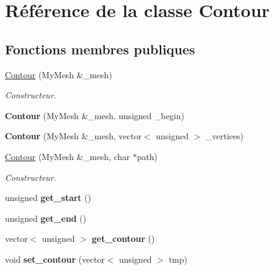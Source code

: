 \hypertarget{classContour}{}\section{Référence de la classe Contour}
\label{classContour}
\subsection*{Fonctions membres publiques}
\begin{DoxyCompactItemize}
\item 
\hyperlink{classContour_a7522d78ab496badf3b1727202ed15492}{Contour} (My\+Mesh \&\+\_\+mesh)
\begin{DoxyCompactList}\small\item\em Constructeur. \end{DoxyCompactList}\item 
\mbox{\label{classContour_a45bf85c9d66109bbdda7d3b688665e2a}} 
{\bfseries Contour} (My\+Mesh \&\+\_\+mesh, unsigned \+\_\+begin)
\item 
\mbox{\label{classContour_a944fb89ff1f9f6dc6850bab1d14479d8}} 
{\bfseries Contour} (My\+Mesh \&\+\_\+mesh, vector$<$ unsigned $>$ \+\_\+vertices)
\item 
\hyperlink{classContour_af584aa2a5e9de4660cb2bc0e187868c6}{Contour} (My\+Mesh \&\+\_\+mesh, char $\ast$path)
\begin{DoxyCompactList}\small\item\em Constructeur. \end{DoxyCompactList}\item 
\mbox{\label{classContour_ac10722aa3766b0c03bfe602209b36a9a}} 
unsigned {\bfseries get\+\_\+start} ()
\item 
\mbox{\label{classContour_abccf731418475131b8d5f4ee08905b99}} 
unsigned {\bfseries get\+\_\+end} ()
\item 
\mbox{\label{classContour_a133f0f87f768742538a77fafb7c2f020}} 
vector$<$ unsigned $>$ {\bfseries get\+\_\+contour} ()
\item 
\mbox{\label{classContour_adb639b570d0f49aa38b114e9728412fa}} 
void {\bfseries set\+\_\+contour} (vector$<$ unsigned $>$ tmp)
\item 

\end{DoxyCompactItemize}
